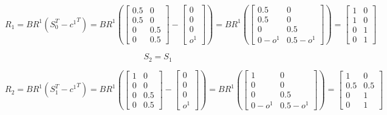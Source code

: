 \documentclass[10]{article}
\begin{document}
\begin{equation*}
R_1=
BR^1(S_0^T-{c^1}^T)=
BR^1(
\begin{bmatrix}
0.5 & 0\\
0.5 & 0\\
0 & 0.5\\
0 & 0.5
\end{bmatrix}
-
\begin{bmatrix}
0 \\
0 \\
0 \\
o^1
\end{bmatrix}
)
=
BR^1(
\begin{bmatrix}
0.5 & 0\\
0.5 & 0\\
0 & 0.5\\
0-o^1 & 0.5-o^1
\end{bmatrix}
)
=
\begin{bmatrix}
1 & 0\\
1 & 0\\
0 & 1\\
0 & 1
\end{bmatrix}
\end{equation*}

\begin{equation*}
S_2=S_1
\end{equation*}

\begin{equation*}
R_2=
BR^1(S_1^T-{c^1}^T)=
BR^1(
\begin{bmatrix}
1 & 0\\
0 & 0\\
0 & 0.5\\
0 & 0.5
\end{bmatrix}
-
\begin{bmatrix}
0 \\
0 \\
0 \\
o^1
\end{bmatrix}
)
=
BR^1(
\begin{bmatrix}
1 & 0\\
0 & 0\\
0 & 0.5\\
0-o^1 & 0.5-o^1
\end{bmatrix}
)
=
\begin{bmatrix}
1 & 0\\
0.5 & 0.5\\
0 & 1\\
0 & 1
\end{bmatrix}
\end{equation*}
\end{document}
